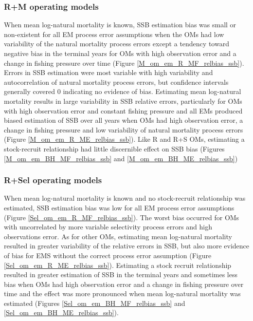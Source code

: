 \documentclass[
  12pt,
]{article}
\begin{document}
\hypertarget{rm-operating-models-2}{%
\subsubsection*{R+M operating models}\label{rm-operating-models-2}}

When mean log-natural mortality is known, SSB estimation bias was small
or non-existent for all EM process error assumptions when the OMs had
low variability of the natural mortality process errors except a
tendency toward negative bias in the terminal years for OMs with high
observation error and a change in fishing pressure over time (Figure
\ref{M_om_em_R_MF_relbias_ssb}). Errors in SSB estimation were most
variable with high variability and autocorrelation of natural mortality
process errors, but confidence intervals generally covered 0 indicating
no evidence of bias. Estimating mean log-natural mortality results in
large variability in SSB relative errors, particularly for OMs with high
observation error and constant fishing pressure and all EMs produced
biased estimation of SSB over all years when OMs had high observation
error, a change in fishing pressure and low variability of natural
mortality process errors (Figure \ref{M_om_em_R_ME_relbias_ssb}). Like R
and R+S OMs, estimating a stock-recruit relationship had little
discernible effect on SSB bias (Figures \ref{M_om_em_BH_MF_relbias_ssb}
and \ref{M_om_em_BH_ME_relbias_ssb})

\hypertarget{rsel-operating-models-2}{%
\subsubsection*{R+Sel operating models}\label{rsel-operating-models-2}}

When mean log-natural mortality is known and no stock-recruit
relationship was estimated, SSB estimation bias was low for all EM
process error assumptions (Figure \ref{Sel_om_em_R_MF_relbias_ssb}). The
worst bias occurred for OMs with uncorrelated by more variable
selectivity process errors and high observations error. As for other
OMs, estimating mean log-natural mortality resulted in greater
variability of the relative errors in SSB, but also more evidence of
bias for EMS without the correct process error assumption (Figure
\ref{Sel_om_em_R_ME_relbias_ssb}). Estimating a stock recruit
relationship resulted in greater estimation of SSB in the terminal years
and sometimes less bias when OMs had high observation error and a change
in fishing pressure over time and the effect was more pronounced when
mean log-natural mortality was estimated (Figures
\ref{Sel_om_em_BH_MF_relbias_ssb} and
\ref{Sel_om_em_BH_ME_relbias_ssb}).
\end{document}
